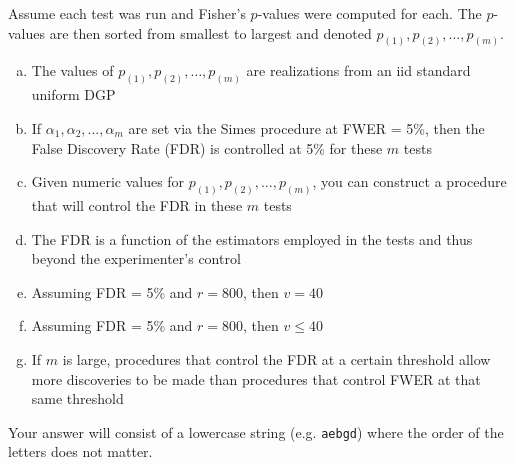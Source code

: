 \documentclass[12pt,landscape]{article}
\newcommand{\instr}{\small Your answer will consist of a lowercase string (e.g. \texttt{aebgd}) where the order of the letters does not matter. \normalsize}
\begin{document}

\problem{}  Assume each test was run and Fisher's $p$-values were computed for each. The $p$-values are then sorted from smallest to largest and denoted $p_{(1)}, p_{(2)}, \ldots, p_{(m)}$.

\vspace{-0.2cm}\benum{} 

\begin{enumerate}[(a)]
\item The values of $p_{(1)}, p_{(2)}, \ldots, p_{(m)}$ are realizations from an iid standard uniform DGP
\item If $\alpha_1, \alpha_2, \ldots, \alpha_m$ are set via the Simes procedure at FWER = 5\%, then the False Discovery Rate (FDR) is controlled at 5\% for these $m$ tests
\item Given numeric values for $p_{(1)}, p_{(2)}, \ldots, p_{(m)}$, you can construct a procedure that will control the FDR in these $m$ tests
\item The FDR is a function of the estimators employed in the tests and thus beyond the experimenter's control
\item Assuming FDR = 5\% and $r = 800$, then $v = 40$
\item Assuming FDR = 5\% and $r = 800$, then $v \leq 40$
\item If $m$ is large, procedures that control the FDR at a certain threshold allow more discoveries to be made  than procedures that control FWER at that same threshold
\end{enumerate}
\eenum\instr\pagebreak
\end{document}
